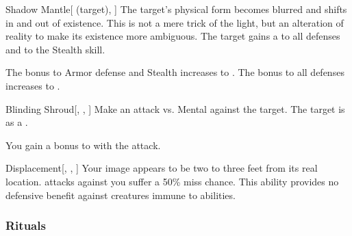 \lowercase{\hypertarget{spell:Shadow Mantle}{}}\label{spell:Shadow Mantle}
\begin{attuneability}[Rank 4]{\hypertarget{spell:Shadow Mantle}{Shadow Mantle}}[ (target), ]
The target's physical form becomes blurred and shifts in and out of existence.
This is not a mere trick of the light, but an alteration of reality to make its existence more ambiguous.
The target gains a   to all defenses and to the Stealth skill.

\rankline
{} The bonus to Armor defense and Stealth increases to .
 The bonus to all defenses increases to .
\end{attuneability}
\vspace{0.25em}



\lowercase{\hypertarget{spell:Blinding Shroud}{}}\label{spell:Blinding Shroud}
\begin{freeability}[Rank 6]{\hypertarget{spell:Blinding Shroud}{Blinding Shroud}}[, , ]
Make an attack vs. Mental against the target.
\hit The target is  as a .

\rankline
{} You gain a  bonus to  with the attack.
\end{freeability}
\vspace{0.25em}



\lowercase{\hypertarget{spell:Displacement}{}}\label{spell:Displacement}
\begin{freeability}[Rank 8]{\hypertarget{spell:Displacement}{Displacement}}[, , ]
Your image appears to be two to three feet from its real location.
  attacks against you suffer a 50\% miss chance.
This ability provides no defensive benefit against creatures immune to  abilities.
\end{freeability}
\vspace{0.25em}



\subsubsection{Rituals}


